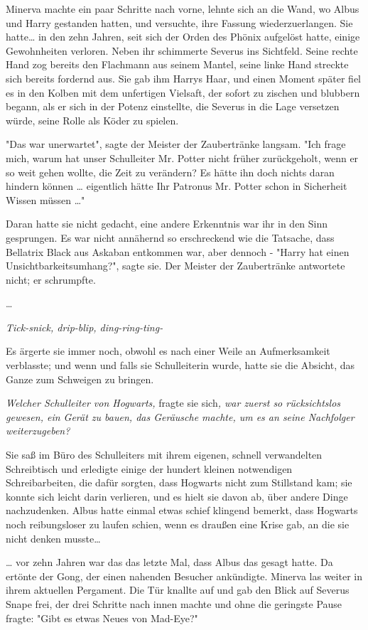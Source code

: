 {Minerva machte ein paar Schritte nach vorne, lehnte sich an die Wand, wo Albus und Harry gestanden hatten, und versuchte, ihre Fassung wiederzuerlangen. Sie hatte… in den zehn Jahren, seit sich der Orden des Phönix aufgelöst hatte, einige Gewohnheiten verloren. Neben ihr schimmerte Severus ins Sichtfeld. Seine rechte Hand zog bereits den Flachmann aus seinem Mantel, seine linke Hand streckte sich bereits fordernd aus. Sie gab ihm Harrys Haar, und einen Moment später fiel es in den Kolben mit dem unfertigen Vielsaft, der sofort zu zischen und blubbern begann, als er sich in der Potenz einstellte, die Severus in die Lage versetzen würde, seine Rolle als Köder zu spielen.

"Das war unerwartet", sagte der Meister der Zaubertränke langsam. "Ich frage mich, warum hat unser Schulleiter Mr. Potter nicht früher zurückgeholt, wenn er so weit gehen wollte, die Zeit zu verändern? Es hätte ihn doch nichts daran hindern können … eigentlich hätte Ihr Patronus Mr. Potter schon in Sicherheit Wissen müssen …"

Daran hatte sie nicht gedacht, eine andere Erkenntnis war ihr in den Sinn gesprungen. Es war nicht annähernd so erschreckend wie die Tatsache, dass Bellatrix Black aus Askaban entkommen war, aber dennoch - "Harry hat einen Unsichtbarkeitsumhang?", sagte sie. Der Meister der Zaubertränke antwortete nicht; er schrumpfte.

…

\emph{Tick-snick, drip-blip, ding-ring-ting-}

Es ärgerte sie immer noch, obwohl es nach einer Weile an Aufmerksamkeit verblasste; und wenn und falls sie Schulleiterin wurde, hatte sie die Absicht, das Ganze zum Schweigen zu bringen.

\emph{Welcher Schulleiter von Hogwarts,} fragte sie sich\emph{, war zuerst so rücksichtslos gewesen, ein Gerät zu bauen, das Geräusche machte, um es an seine Nachfolger weiterzugeben?}

Sie saß im Büro des Schulleiters mit ihrem eigenen, schnell verwandelten Schreibtisch und erledigte einige der hundert kleinen notwendigen Schreibarbeiten, die dafür sorgten, dass Hogwarts nicht zum Stillstand kam; sie konnte sich leicht darin verlieren, und es hielt sie davon ab, über andere Dinge nachzudenken. Albus hatte einmal etwas schief klingend bemerkt, dass Hogwarts noch reibungsloser zu laufen schien, wenn es draußen eine Krise gab, an die sie nicht denken musste…

… vor zehn Jahren war das das letzte Mal, dass Albus das gesagt hatte. Da ertönte der Gong, der einen nahenden Besucher ankündigte. Minerva las weiter in ihrem aktuellen Pergament. Die Tür knallte auf und gab den Blick auf Severus Snape frei, der drei Schritte nach innen machte und ohne die geringste Pause fragte: "Gibt es etwas Neues von Mad-Eye?"

}
